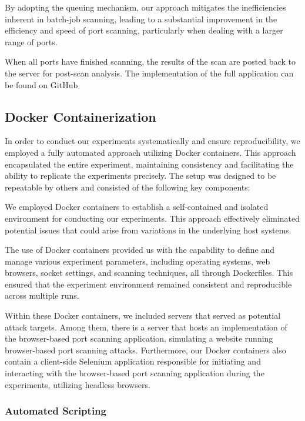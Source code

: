 By adopting the queuing mechanism, our approach mitigates the inefficiencies inherent in batch-job scanning, leading to a substantial improvement in the efficiency and speed of port scanning, particularly when dealing with a larger range of ports.

When all ports have finished scanning, the results of the scan are posted back to the server for post-scan analysis. The implementation of the full application can be found on GitHub~\cite{bvdl2023}

\subsection{Docker Containerization}
\label{section:experiment-setup}

In order to conduct our experiments systematically and ensure reproducibility, we employed a fully automated approach utilizing Docker containers. This approach encapsulated the entire experiment, maintaining consistency and facilitating the ability to replicate the experiments precisely. The setup was designed to be repeatable by others and consisted of the following key components:

We employed Docker containers to establish a self-contained and isolated environment for conducting our experiments. This approach effectively eliminated potential issues that could arise from variations in the underlying host systems.

The use of Docker containers provided us with the capability to define and manage various experiment parameters, including operating systems, web browsers, socket settings, and scanning techniques, all through Dockerfiles. This ensured that the experiment environment remained consistent and reproducible across multiple runs.

Within these Docker containers, we included servers that served as potential attack targets. Among them, there is a server that hosts an implementation of the browser-based port scanning application, simulating a website running browser-based port scanning attacks. Furthermore, our Docker containers also contain a client-side Selenium application responsible for initiating and interacting with the browser-based port scanning application during the experiments, utilizing headless browsers.

\subsubsection{Automated Scripting}

